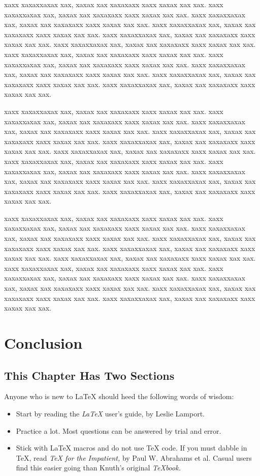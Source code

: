 xaxx xaxaxxaxax xax, xaxax xax xaxaxaxx xaxx xaxax xax xax.
xaxx xaxaxxaxax xax, xaxax xax xaxaxaxx xaxx xaxax xax xax.
xaxx xaxaxxaxax xax, xaxax xax xaxaxaxx xaxx xaxax xax xax.
xaxx xaxaxxaxax xax, xaxax xax xaxaxaxx xaxx xaxax xax xax.
xaxx xaxaxxaxax xax, xaxax xax xaxaxaxx xaxx xaxax xax xax.
xaxx xaxaxxaxax xax, xaxax xax xaxaxaxx xaxx xaxax xax xax.
xaxx xaxaxxaxax xax, xaxax xax xaxaxaxx xaxx xaxax xax xax.
xaxx xaxaxxaxax xax, xaxax xax xaxaxaxx xaxx xaxax xax xax.
xaxx xaxaxxaxax xax, xaxax xax xaxaxaxx xaxx xaxax xax xax.
xaxx xaxaxxaxax xax, xaxax xax xaxaxaxx xaxx xaxax xax xax.
xaxx xaxaxxaxax xax, xaxax xax xaxaxaxx xaxx xaxax xax xax.

xaxx xaxaxxaxax xax, xaxax xax xaxaxaxx xaxx xaxax xax xax.
xaxx xaxaxxaxax xax, xaxax xax xaxaxaxx xaxx xaxax xax xax.
xaxx xaxaxxaxax xax, xaxax xax xaxaxaxx xaxx xaxax xax xax.
xaxx xaxaxxaxax xax, xaxax xax xaxaxaxx xaxx xaxax xax xax.
xaxx xaxaxxaxax xax, xaxax xax xaxaxaxx xaxx xaxax xax xax.
xaxx xaxaxxaxax xax, xaxax xax xaxaxaxx xaxx xaxax xax xax.
xaxx xaxaxxaxax xax, xaxax xax xaxaxaxx xaxx xaxax xax xax.
xaxx xaxaxxaxax xax, xaxax xax xaxaxaxx xaxx xaxax xax xax.
xaxx xaxaxxaxax xax, xaxax xax xaxaxaxx xaxx xaxax xax xax.
xaxx xaxaxxaxax xax, xaxax xax xaxaxaxx xaxx xaxax xax xax.
xaxx xaxaxxaxax xax, xaxax xax xaxaxaxx xaxx xaxax xax xax.

xaxx xaxaxxaxax xax, xaxax xax xaxaxaxx xaxx xaxax xax xax.
xaxx xaxaxxaxax xax, xaxax xax xaxaxaxx xaxx xaxax xax xax.
xaxx xaxaxxaxax xax, xaxax xax xaxaxaxx xaxx xaxax xax xax.
xaxx xaxaxxaxax xax, xaxax xax xaxaxaxx xaxx xaxax xax xax.
xaxx xaxaxxaxax xax, xaxax xax xaxaxaxx xaxx xaxax xax xax.
xaxx xaxaxxaxax xax, xaxax xax xaxaxaxx xaxx xaxax xax xax.
xaxx xaxaxxaxax xax, xaxax xax xaxaxaxx xaxx xaxax xax xax.
xaxx xaxaxxaxax xax, xaxax xax xaxaxaxx xaxx xaxax xax xax.
xaxx xaxaxxaxax xax, xaxax xax xaxaxaxx xaxx xaxax xax xax.
xaxx xaxaxxaxax xax, xaxax xax xaxaxaxx xaxx xaxax xax xax.
xaxx xaxaxxaxax xax, xaxax xax xaxaxaxx xaxx xaxax xax xax.


\chapter{Conclusion}

\section{This Chapter Has Two Sections}

Anyone who is new to LaTeX should heed the following words of wisdom:
\begin{itemize}
\item Start by reading the {\em LaTeX} user's guide, by Leslie Lamport.
\item Practice a lot.  Most questions can be answered by trial and 
error.
\item Stick with LaTeX macros and do not use TeX code.  If you must 
dabble in TeX, read {\em TeX for the Impatient,} by Paul W. Abrahams et 
al.
Casual users find this easier going than Knuth's original {\em TeXbook.}
\end{itemize}

